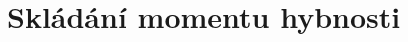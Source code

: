 \section{Skládání momentu hybnosti}
\label{sec:SkladaniMomentuHybnosti}

\begin{theory}
	
\end{theory}




